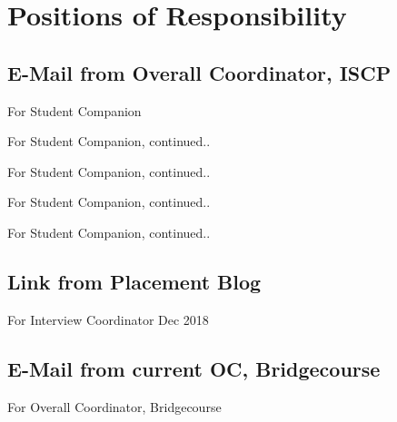\documentclass{article}
\begin{document}
\section{Positions of Responsibility}
	\subsection{E-Mail from Overall Coordinator, ISCP}
		For Student Companion
		\begin{figure}[h]
		\end{figure}
\newpage
		For Student Companion, continued..
		\begin{figure}[h]
		\end{figure}
\newpage
		For Student Companion, continued..
		\begin{figure}[h]
		\end{figure}
\newpage
		For Student Companion, continued..
		\begin{figure}[h]
		\end{figure}
\newpage
		For Student Companion, continued..
		\begin{figure}[h]
		\end{figure}
\newpage
	\subsection{Link from Placement Blog}
		For Interview Coordinator Dec 2018\\
		\begin{figure}[h]
		\end{figure}
\newpage
		\begin{figure}[h]
		\end{figure}
\newpage
	\subsection{E-Mail from current OC, Bridgecourse}
		For Overall Coordinator, Bridgecourse
		\begin{figure}[h]
		\end{figure}
\newpage
\end{document}

